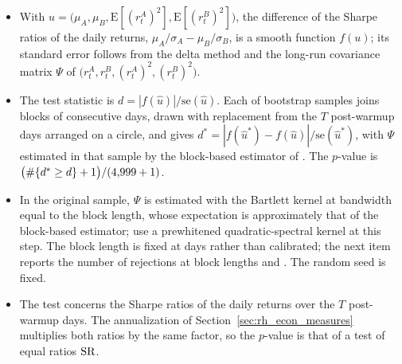 \begin{itemize}
  \begin{itemize}
  \item With $u = \bigl(\mu_A, \mu_B, \mathrm E[(r^A_t)^2], \mathrm E[(r^B_t)^2]\bigr)$, the difference of the Sharpe ratios of the daily returns, $\mu_A/\sigma_A - \mu_B/\sigma_B$, is a smooth function $f(u)$; its standard error follows from the delta method and the long-run covariance matrix $\Psi$ of $\bigl(r^A_t, r^B_t, (r^A_t)^2, (r^B_t)^2\bigr)$.
  \item The test statistic is $d = |f(\hat u)| / \mathrm{se}(\hat u)$. Each of \rheLWBoot{} bootstrap samples joins blocks of \rheLWBlock{} consecutive days, drawn with replacement from the $T$ post-warmup days arranged on a circle, and gives $d^{*} = |f(\hat u^{*}) - f(\hat u)| / \mathrm{se}(\hat u^{*})$, with $\Psi$ estimated in that sample by the block-based estimator of \citet{LedoitWolf2008}. The $p$-value is $\bigl(\#\{d^{*} \ge d\} + 1\bigr)/(4{,}999 + 1)$.
  \item In the original sample, $\Psi$ is estimated with the Bartlett kernel at bandwidth equal to the block length, whose expectation is approximately that of the block-based estimator; \citet{LedoitWolf2008} use a prewhitened quadratic-spectral kernel at this step. The block length is fixed at \rheLWBlock{} days rather than calibrated; the next item reports the number of rejections at block lengths \rheLWBlockLo{} and \rheLWBlockHi{}. The random seed is fixed.
  \item The test concerns the Sharpe ratios of the daily returns over the $T$ post-warmup days. The annualization of Section~\ref{sec:rh_econ_measures} multiplies both ratios by the same factor, so the $p$-value is that of a test of equal ratios $\mathrm{SR}$.
  \end{itemize}

\end{itemize}
